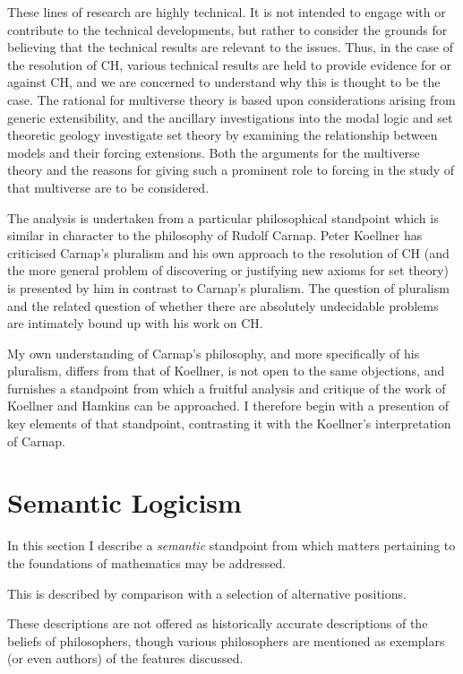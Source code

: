 \documentclass[10pt,titlepage]{article}
\begin{document}
These lines of research are highly technical.
It is not intended to engage with or contribute to the technical developments, but rather to consider the grounds for believing that the technical results are relevant to the issues.
Thus, in the case of the resolution of CH, various technical results are held to provide evidence for or against CH, and we are concerned to understand why this is thought to be the case.
The rational for multiverse theory is based upon considerations arising from generic extensibility, and the ancillary investigations into the modal logic and set theoretic geology investigate set theory by examining the relationship between models and their forcing extensions.
Both the arguments for the multiverse theory and the reasons for giving such a prominent role to forcing in the study of that multiverse are to be considered.

The analysis is undertaken from a particular philosophical standpoint which is similar in character to the philosophy of Rudolf Carnap.
Peter Koellner has criticised Carnap's pluralism and his own approach to the resolution of CH (and the more general problem of discovering or justifying new axioms for set theory) is presented by him in contrast to Carnap's pluralism.
The question of pluralism and the related question of whether there are absolutely undecidable problems are intimately bound up with his work on CH.

My own understanding of Carnap's philosophy, and more specifically of his pluralism, differs from that of Koellner, is not open to the same objections, and furnishes a standpoint from which a fruitful analysis and critique of the work of Koellner and Hamkins can be approached.
I therefore begin with a presention of key elements of that standpoint, contrasting it with the Koellner's interpretation of Carnap.

\section{Semantic Logicism}

In this section I describe a \emph{semantic} standpoint from which matters pertaining to the foundations of mathematics may be addressed.

This is described by comparison with a selection of alternative positions.

These descriptions are not offered as historically accurate descriptions of the beliefs of philosophers, though various philosophers are mentioned as exemplars (or even authors) of the features discussed.
\end{document}
